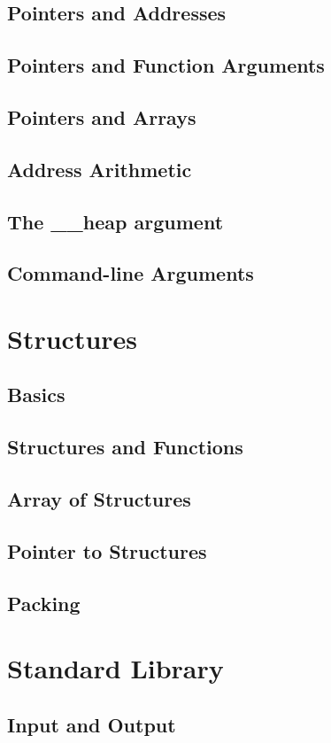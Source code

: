 \documentclass{scrartcl}
\begin{document}
        \subsection{Pointers and Addresses}
        \subsection{Pointers and Function Arguments}
        \subsection{Pointers and Arrays}
        \subsection{Address Arithmetic}
        \subsection{The \_\_heap argument}
        \subsection{Command-line Arguments}
    \section{Structures}
        \subsection{Basics}
        \subsection{Structures and Functions}
        \subsection{Array of Structures}
        \subsection{Pointer to Structures}
        \subsection{Packing}
    \section{Standard Library}
        \subsection{Input and Output}
\end{document}
